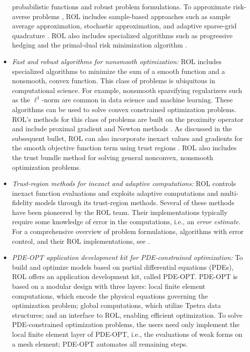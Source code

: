 \begin{itemize}
probabilistic functions and robust problem formulations. To approximate
risk-averse problems \cite{shapiro2021lectures}, ROL includes sample-based
approaches such as sample average approximation, stochastic approximation, and
adaptive sparse-grid quadrature \cite{kouri2013trust,kouri2014inexact}. ROL
also includes specialized algorithms such as progressive hedging
\cite{rockafellar1991scenarios} and the primal-dual risk minimization algorithm
\cite{kouri2022primal}.
\item
\emph{Fast and robust algorithms for nonsmooth optimization:}
ROL includes specialized algorithms to minimize the sum of a smooth function
and a nonsmooth, convex function.  This class of problems is ubiquitous in
computational science.  For example, nonsmooth sparsifying regularizers such as
the $\ell^1$-norm are common in data science and machine learning.  These
algorithms can be used to solve convex constrained optimization problems.
ROL's methods for this class of problems are built on the proximity operator
and include proximal gradient and Newton methods
\cite{beck2017first,kanzow2021globalized,ochs2014iPiano}.
As discussed in the subsequent bullet, ROL can also incorporate inexact
values and gradients for the smooth objective function term using trust regions
\cite{baraldi2023proximal}.
ROL also includes the trust bundle method \cite{schramm1992bundle}
for solving general nonconvex, nonsmooth optimization problems.
\item
\emph{Trust-region methods for inexact and adaptive computations:}
ROL controls inexact function evaluations and exploits adaptive computations
and multi-fidelity models through its trust-region methods. Several of these methods
have been pioneered by the ROL team.  Their implementations typically require some
knowledge of error in the computations, i.e., an \emph{error estimate}.
For a comprehensive overview of problem formulations, algorithms with error control,
and their ROL implementations, see \cite{Kouri2018}.
\item
\emph{PDE-OPT application development kit for PDE-constrained optimization:}
To build and optimize models based on partial differential equations (PDEs),
ROL offers an application development kit, called PDE-OPT. PDE-OPT is based on a
modular design with three layers: local finite element computations,
which encode the physical equations governing the optimization problem;
global computations, which utilize Tpetra data structures;
and an interface to ROL, enabling efficient optimization.
To solve PDE-constrained optimization problems, the users need only implement the
local finite element layer of PDE-OPT, i.e., the evaluations of weak forms on
a mesh element; PDE-OPT automates all remaining steps.
\end{itemize}




